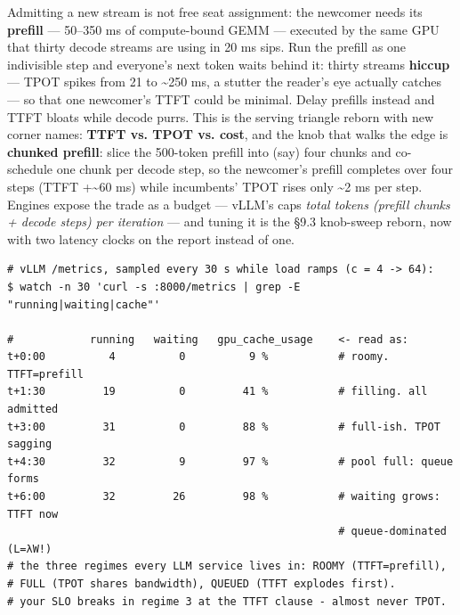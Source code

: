 Admitting a new stream is not free seat assignment: the newcomer needs its \textbf{prefill} — 50–350 ms of compute-bound GEMM — executed by the same GPU that thirty decode streams are using in 20 ms sips. Run the prefill as one indivisible step and everyone's next token waits behind it: thirty streams \textbf{hiccup} — TPOT spikes from 21 to \textasciitilde{}250 ms, a stutter the reader's eye actually catches — so that one newcomer's TTFT could be minimal. Delay prefills instead and TTFT bloats while decode purrs. This is the serving triangle reborn with new corner names: \textbf{TTFT vs. TPOT vs. cost}, and the knob that walks the edge is \textbf{chunked prefill}: slice the 500-token prefill into (say) four chunks and co-schedule one chunk per decode step, so the newcomer's prefill completes over four steps (TTFT +\textasciitilde{}60 ms) while incumbents' TPOT rises only \textasciitilde{}2 ms per step. Engines expose the trade as a budget — vLLM's  caps \textit{total tokens (prefill chunks + decode steps) per iteration} — and tuning it is the §9.3 knob-sweep reborn, now with two latency clocks on the report instead of one.

\begin{terminalbox}
\begin{Verbatim}[breaklines=true,breakanywhere=true,fontsize=\small,formatcom=\color{tbbtermfg},codes=\tbbcodeactive]
# vLLM /metrics, sampled every 30 s while load ramps (c = 4 -> 64):
$ watch -n 30 'curl -s :8000/metrics | grep -E "running|waiting|cache"'

#            running   waiting   gpu_cache_usage    <- read as:
t+0:00          4          0          9 %           # roomy. TTFT=prefill
t+1:30         19          0         41 %           # filling. all admitted
t+3:00         31          0         88 %           # full-ish. TPOT sagging
t+4:30         32          9         97 %           # pool full: queue forms
t+6:00         32         26         98 %           # waiting grows: TTFT now
                                                    # queue-dominated (L=λW!)
# the three regimes every LLM service lives in: ROOMY (TTFT=prefill),
# FULL (TPOT shares bandwidth), QUEUED (TTFT explodes first).
# your SLO breaks in regime 3 at the TTFT clause - almost never TPOT.
\end{Verbatim}
\end{terminalbox}

